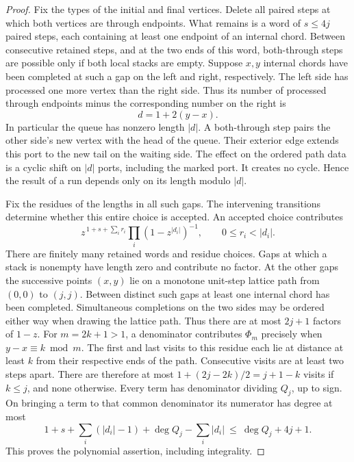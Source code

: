 \begin{proof}
Fix the types of the initial and final vertices. Delete all paired
steps at which both vertices are through endpoints. What remains is a
word of \(s\le4j\) paired steps, each containing at least one endpoint
of an internal chord. Between consecutive retained steps, and at the
two ends of this word, both-through steps are possible only if both
local stacks are empty. Suppose \(x,y\) internal chords have been
completed at such a gap on the left and right, respectively. The left
side has processed one more vertex than the right side. Thus its number
of processed through endpoints minus the corresponding number on the
right is
\[
                 d=1+2(y-x).
\]
In particular the queue has nonzero length \(|d|\). A both-through step
pairs the other side's new vertex with the head of the queue. Their
exterior edge extends this port to the new tail on the waiting side.
The effect on the ordered path data is a cyclic shift on \(|d|\) ports,
including the marked port. It creates no cycle. Hence the result of a
run depends only on its length modulo \(|d|\).

Fix the residues of the lengths in all such gaps. The intervening
transitions determine whether this entire choice is accepted. An
accepted choice contributes
\[
 z^{\,1+s+\sum_i r_i}\prod_i(1-z^{|d_i|})^{-1},
                 \qquad 0\le r_i<|d_i|.
\]
There are finitely many retained words and residue choices. Gaps at
which a stack is nonempty have length zero and contribute no factor.
At the other gaps the successive points \((x,y)\) lie on a monotone
unit-step lattice path from \((0,0)\) to \((j,j)\). Between distinct
such gaps at least one internal chord has been completed. Simultaneous
completions on the two sides may be ordered either way when drawing
the lattice path. Thus there are at most \(2j+1\) factors of \(1-z\).
For \(m=2k+1>1\), a denominator contributes \(\Phi_m\) precisely when
\(y-x\equiv k\bmod m\). The first and last visits to this residue each
lie at distance at least \(k\) from their respective ends of the path.
Consecutive visits are at least two steps apart. There are therefore
at most \(1+(2j-2k)/2=j+1-k\) visits if \(k\le j\), and none otherwise.
Every term has denominator dividing \(Q_j\), up to sign. On bringing a
term to that common denominator its numerator has degree at most
\[
 1+s+\sum_i (|d_i|-1)+\deg Q_j-\sum_i|d_i|
 \ \le\ \deg Q_j+4j+1 .
\]
This proves the polynomial assertion, including integrality.


\end{proof}
